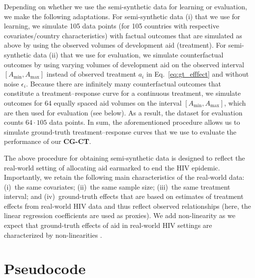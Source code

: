 \documentclass[sigconf]{acmart}
\newcommand{\framework}{\textbf{\mbox{CG-CT}}\xspace}
\begin{document}
Depending on whether we use the semi-synthetic data for learning or evaluation, we make the following adaptations. For semi-synthetic data (i) that we use for learning, we simulate 105 data points (for 105 countries with respective covariates/country characteristics) with factual outcomes that are simulated as above by using the observed volumes of development aid (treatment). For semi-synthetic data (ii) that we use for evaluation, we simulate counterfactual outcomes by using varying volumes of development aid on the observed interval $[A_{\mathrm{min}}, A_{\mathrm{max}}]$ instead of observed treatment $a_i$ in Eq.~\eqref{eq:gt_efffect} and without noise $\epsilon_i$. Because there are infinitely many counterfactual outcomes that constitute a treatment--response curve for a continuous treatment, we simulate outcomes for 64 equally spaced aid volumes on the interval $[A_{\mathrm{min}}, A_{\mathrm{max}}]$, which are then used for evaluation (see below). As a result, the dataset for evaluation counts $64 \cdot 105$ data points. In sum, the aforementioned procedure allows us to simulate ground-truth treatment--response curves that we use to evaluate the performance of our \framework.  

The above procedure for obtaining semi-synthetic data is designed to reflect the real-world setting of allocating aid earmarked to end the HIV epidemic. Importantly, we retain the following main characteristics of the real-world data: (i)~the same covariates; (ii)~the same sample size; (iii)~the same treatment interval; and (iv)~ground-truth effects that are based on estimates of treatment effects from real-world HIV data and thus reflect observed relationships (here, the linear regression coefficients are used as proxies). We add non-linearity as we expect that ground-truth effects of aid in real-world HIV settings are characterized by non-linearities \cite{Jakubik2022}. 

\newpage 


\section{Pseudocode}
\label{supp:pseudocode}
\end{document}
